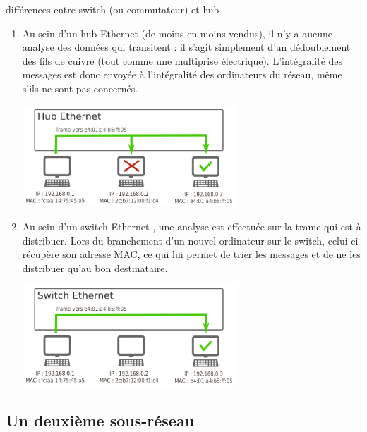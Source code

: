 \documentclass[a4paper,dvipsnames]{article}
\begin{document}
\medskip


\begin{definition}[breakable]{différences entre switch (ou commutateur) et hub}{}
 \begin{enumerate}
   \item Au sein d'un {\color{red}hub Ethernet} (de moins en moins vendus), il n'y a aucune analyse des données qui transitent : il s'agit simplement d'un dédoublement des fils de cuivre (tout comme une multiprise électrique). L'intégralité des messages est donc envoyée à l'intégralité des ordinateurs du réseau, même s'ils ne sont pas concernés.

     \begin{center}
       \includegraphics[width=8cm]{img/hub.png}
     \end{center}

   \item Au sein d'un {\color{red}switch Ethernet} , une analyse est effectuée sur la trame qui est à distribuer. Lors du branchement d'un nouvel ordinateur sur le switch, celui-ci récupère son adresse MAC, ce qui lui permet de trier les messages et de ne les distribuer qu'au bon destinataire.

     \begin{center}
       \includegraphics[width=8cm]{img/switch.png}
     \end{center}
 \end{enumerate}
\end{definition}

\subsection{Un deuxième sous-réseau}
\end{document}
